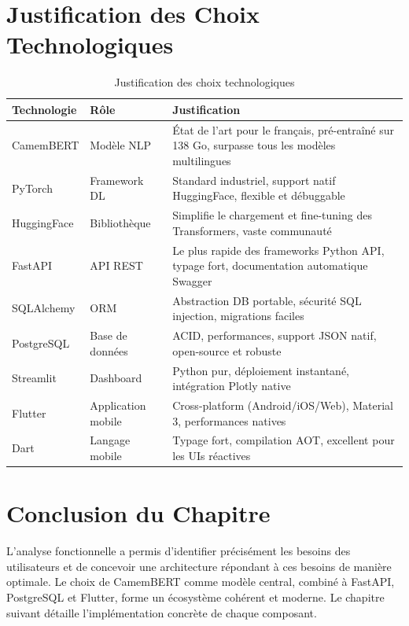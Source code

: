 \section{Justification des Choix Technologiques}

\begin{table}[H]
\centering
\caption{Justification des choix technologiques}
\label{tab:choix_tech}
\renewcommand{\arraystretch}{1.5}
\begin{tabular}{p{2.5cm} p{3cm} p{7cm}}
\toprule
\rowcolor{bleuprincipal!15}
\textbf{Technologie} & \textbf{Rôle} & \textbf{Justification} \\
\midrule
CamemBERT & Modèle NLP & État de l'art pour le français, pré-entraîné sur 138 Go, surpasse tous les modèles multilingues \\
\midrule
\rowcolor{gray!8}
PyTorch & Framework DL & Standard industriel, support natif HuggingFace, flexible et débuggable \\
\midrule
HuggingFace & Bibliothèque & Simplifie le chargement et fine-tuning des Transformers, vaste communauté \\
\midrule
\rowcolor{gray!8}
FastAPI & API REST & Le plus rapide des frameworks Python API, typage fort, documentation automatique Swagger \\
\midrule
SQLAlchemy & ORM & Abstraction DB portable, sécurité SQL injection, migrations faciles \\
\midrule
\rowcolor{gray!8}
PostgreSQL & Base de données & ACID, performances, support JSON natif, open-source et robuste \\
\midrule
Streamlit & Dashboard & Python pur, déploiement instantané, intégration Plotly native \\
\midrule
\rowcolor{gray!8}
Flutter & Application mobile & Cross-platform (Android/iOS/Web), Material 3, performances natives \\
\midrule
Dart & Langage mobile & Typage fort, compilation AOT, excellent pour les UIs réactives \\
\bottomrule
\end{tabular}
\end{table}

\section*{Conclusion du Chapitre}

L'analyse fonctionnelle a permis d'identifier précisément les besoins des
utilisateurs et de concevoir une architecture répondant à ces besoins de
manière optimale. Le choix de CamemBERT comme modèle central, combiné à
FastAPI, PostgreSQL et Flutter, forme un écosystème cohérent et moderne.
Le chapitre suivant détaille l'implémentation concrète de chaque composant.

\cleardoublepage
